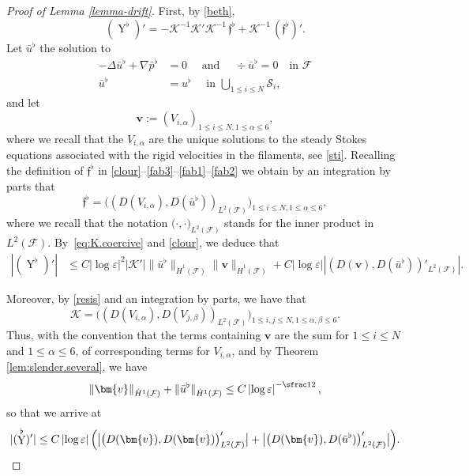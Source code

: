 \documentclass[10pt]{amsart}
\newcommand{\bv}{\bm{v}}
\let\eps\varepsilon
\DeclareMathOperator{\Y}{Y}
\theoremstyle{definition}
\theoremstyle{remark}
\begin{document}
\begin{proof}[Proof of Lemma \ref{lemma-drift}]
First, by \eqref{beth},
\begin{equation}
(\Y^\flat)'
= - \mathcal K^{-1} \mathcal K' \mathcal K^{-1} \, \mathfrak{f}^\flat + \mathcal K^{-1} \, (\mathfrak{f}^\flat)'.
\end{equation}
Let $\bar u^\flat$ the solution to
\begin{align*}
- \Delta \bar u^\flat + \nabla \bar p^\flat &= 0 \quad \text{ and }\quad \div {\bar u^\flat} = 0 \quad \text{in } \mathcal F \\
\bar u^\flat &= u^\flat \quad \text{ in } \bigcup_{1 \leq i \leq N} \mathcal S_i,
\end{align*}
and let
\[
\bv := (V_{i,\alpha})_{1\leq i \leq N, 1 \leq \alpha \leq 6},\]
where we recall that the $ V_{i,\alpha}$ are the unique solutions to the steady Stokes equations associated with the rigid velocities in the filaments, see \eqref{sti}.
Recalling the definition of $ \mathfrak{f}^\flat $ in \eqref{clour}--\eqref{fab3}--\eqref{fab1}--\eqref{fab2}
we obtain by an integration by parts that
\begin{equation*}
\mathfrak{f}^\flat = \Big((D (V_{i,\alpha}),D (\bar u^\flat))_{L^2(\mathcal F)} \Big)_{1\leq i \leq N, 1 \leq \alpha \leq 6},
\end{equation*}
where we recall that the notation $\big(\cdot, \cdot\big)_{L^2(\mathcal F)}$ stands for the inner product in $L^2(\mathcal F)$.
By~\eqref{eq:K.coercive} and \eqref{clour},
we deduce that
\begin{equation}
\begin{aligned}
|(\Y^\flat)'| &\leq C \left|\log \eps\right|^2 |\mathcal K'| \| \bar u^\flat\|_{\dot H^1(\mathcal F)} \|\bv\|_{\dot H^1(\mathcal F)}
+ C \left|\log \eps\right| |(D (\bv), D (\bar u^\flat))'_{L^2(\mathcal F)}|.
\end{aligned}
\end{equation}

Moreover, by \eqref{resis} and an integration by parts, we have that
\begin{equation*}
\mathcal K = \Big((D (V_{i,\alpha}),D (V_{j,\beta}))_{L^2(\mathcal F)} \Big)_{1\leq i,j \leq N, 1 \leq \alpha,\beta \leq 6}.
\end{equation*}
Thus, with the convention that the terms containing $\bv$ are the sum for $1\leq i \leq N$ and $ 1 \leq \alpha \leq 6$, of corresponding terms for $V_{i,\alpha}$,
and by Theorem \ref{lem:slender.several}, we have
\[
\|\bv \|_{\dot H^1(\mathcal F)}
+ \| \bar u^\flat \|_{\dot H^1(\mathcal F)}
\leq C \left|\log \eps\right|^{-\sfrac12},\]
so that we arrive at
\begin{equation} \label{est:s..}
|(\Y^\flat)'| \leq C \left|\log \eps\right| \Bigl(\bigl|\big(D (\bv),
D (\bv)\big)_{L^2(\mathcal F)}'\bigr|
+ \bigl|\big(D(\bv), D (\bar u^\flat)\big)'_{L^2(\mathcal F)}\bigr|
\Bigr).
\end{equation}


\end{proof}
\end{document}
